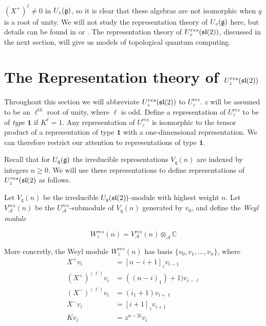 $(X^+)^\ell \neq 0$ in $U_z(\mathfrak{g})$, so it is clear that these algebras
are not isomorphic when $q$ is a root of unity. We will not study the
representation theory of $U_z(\mathfrak{g})$ here, but details can be found in
\cite{Kassel1994} or \cite{Jantzen1995}. The representation theory of
$U_z^{res}(\mathfrak{sl}(2))$, discussed in the next section, will give us models
of topological quantum computing. 

\section{The Representation theory of $U_z^{res}(\mathfrak{sl}(2))$}
\label{section:RepTheoryofResSL2}

Throughout this section we will abbreviate $U_z^{res}(\mathfrak{sl}(2))$ to $U_z^{res}$.
$z$ will be assumed to be an $\ell^{th}$ root of unity, where $\ell$ is odd.
Define a representation of $U_z^{res}$ to be of \emph{type $\mathbf{1}$} if
$K^\ell = 1$. Any representation of $U_z^{res}$ is isomorphic to the tensor
product of a representation of type $\mathbf{1}$ with a one-dimensional
representation. We can therefore restrict our attention to representations of
type $\mathbf{1}$. 

Recall that for $U_q(\mathfrak{g})$ the irreducible representations $V_q(n)$ are
indexed by integers $n \geq 0$. We will use these representations to define
representations of $U_z^{res}(\mathfrak{sl}(2)$ as follows.

Let $V_q(n)$ be the irreducible $U_q(\mathfrak{sl}(2))$-module with highest weight $n$.
Let $V_\mathcal{A}^{res}(n)$ be the $U_\mathcal{A}^{res}$-submodule of $V_q(n)$
generated by $v_0$, and define the \emph{Weyl module}

\begin{equation}
    W_z^{res}(n) = V_\mathcal{A}^{res}(n) \otimes_\mathcal{A} \mathbb{C}
\end{equation}


More concretly, the Weyl module $W_z^{res}(n)$ has basis $\{v_0, v_1, \ldots, v_n\}$, where
\begin{align}
    X^+ v_i &= [n-i+1]_z v_{i-1} \\
    (X^+)^{(\ell)} v_i &= ( (n-i)_1) + 1) v_{i-\ell} \\
    (X^-)^{(\ell)} v_i &= ( i_1 + 1) v_{i+\ell} \\
    X^-v_i &= [i+1]_z v_{i+1} \\
    Kv_i &= z^{n-2i} v_i \\
\end{align}

